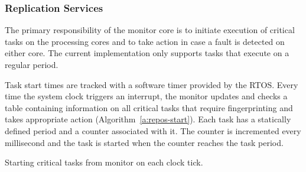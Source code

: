 

\subsubsection{Replication Services}
	The primary responsibility of the monitor core is to initiate execution of critical tasks on the processing cores and to take action in case a fault is detected on either core. 
	The current implementation only supports tasks that execute on a regular period. 
	
	Task start times are tracked with a software timer provided by the RTOS. 
	Every time the system clock triggers an interrupt, the monitor updates and checks a table containing information on all critical tasks that require fingerprinting and takes appropriate action (Algorithm~\ref{a:repos-start}).
	Each task has a statically defined period and a counter associated with it. 
	The counter is incremented every millisecond and the task is started when the counter reaches the task period.

\begin{algorithm}
\caption{Starting critical tasks from monitor on each clock tick.}
\label{a:repos-start}
\end{algorithm}	


